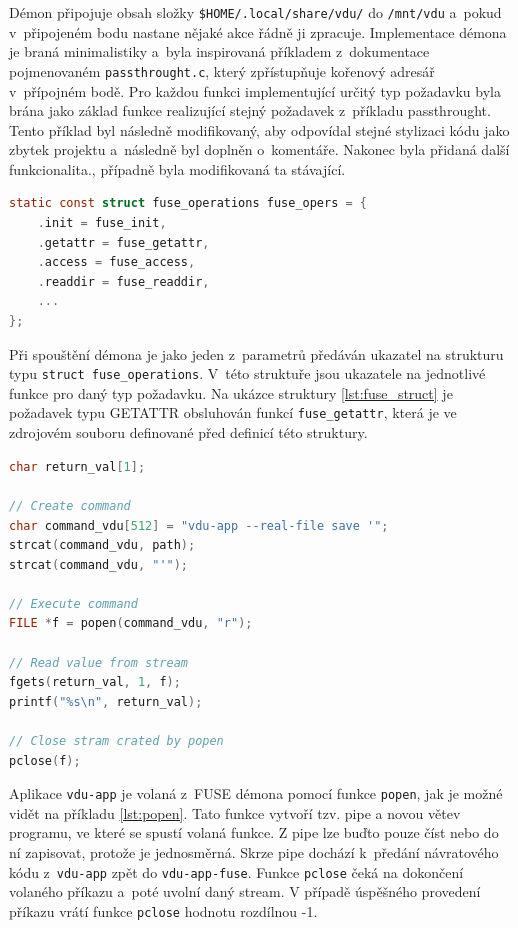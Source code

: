 Démon připojuje obsah složky \texttt{\$HOME/.local/share/vdu/} do \texttt{/mnt/vdu} a pokud v připojeném bodu nastane nějaké akce řádně ji zpracuje. Implementace démona
je braná minimalistiky a byla inspirovaná příkladem z dokumentace pojmenovaném \texttt{passthrought.c}, který zpřístupňuje kořenový adresář v přípojném bodě. Pro každou 
funkci implementující určitý typ požadavku byla brána jako základ funkce realizující stejný požadavek z příkladu passthrought. Tento příklad byl následně modifikovaný,
aby odpovídal stejné stylizaci kódu jako zbytek projektu a následně byl doplněn o komentáře. Nakonec byla přidaná další funkcionalita., případně byla modifikovaná ta stávající.

\newpage

\begin{lstlisting}[language={c}, caption={Část struktury předávané FUSE démonovi.}, label={lst:fuse_struct}]
static const struct fuse_operations fuse_opers = {
    .init = fuse_init,
    .getattr = fuse_getattr,
    .access = fuse_access,
    .readdir = fuse_readdir,
    ...
};
\end{lstlisting}

Při spouštění démona je jako jeden z parametrů předáván ukazatel na strukturu typu \texttt{\mbox{struct fuse\_operations}}. V této struktuře jsou ukazatele na jednotlivé funkce
pro daný typ požadavku. Na ukázce struktury \ref{lst:fuse_struct} je požadavek typu GETATTR obsluhován funkcí \texttt{fuse\_getattr}, která je ve zdrojovém souboru definované před 
definicí této struktury.

\begin{lstlisting}[language={c}, caption={Příklad volání vdu-app z FUSE démona.}, label={lst:popen}]
char return_val[1];

// Create command
char command_vdu[512] = "vdu-app --real-file save '";
strcat(command_vdu, path);
strcat(command_vdu, "'");

// Execute command
FILE *f = popen(command_vdu, "r");

// Read value from stream
fgets(return_val, 1, f);
printf("%s\n", return_val);

// Close stram crated by popen
pclose(f);
\end{lstlisting}

Aplikace \texttt{vdu-app} je volaná z FUSE démona pomocí funkce \texttt{popen}, jak je možné vidět na příkladu \ref{lst:popen}. Tato funkce vytvoří tzv. pipe 
a novou větev programu, ve které se spustí volaná funkce. Z pipe lze buďto pouze číst nebo do ní zapisovat, protože je jednosměrná. Skrze pipe 
dochází k předání návratového kódu z \texttt{vdu-app} zpět do \texttt{vdu-app-fuse}. Funkce \texttt{pclose} čeká na dokončení volaného příkazu a poté uvolní daný stream.
V případě úspěšného provedení příkazu vrátí funkce \texttt{pclose} hodnotu rozdílnou -1. 

